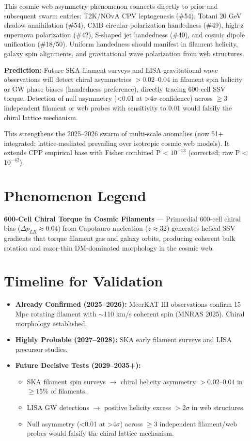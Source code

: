 \documentclass[11pt]{article}
\begin{document}
This cosmic-web asymmetry phenomenon connects directly to prior and subsequent swarm entries: T2K/NOvA CPV leptogenesis (\#54), Totani 20 GeV shadow annihilation (\#54), CMB circular polarization handedness (\#49), high-z supernova polarization (\#42), S-shaped jet handedness (\#40), and cosmic dipole unification (\#18/50). Uniform handedness should manifest in filament helicity, galaxy spin alignments, and gravitational wave polarization from web structures.

\textbf{Prediction:} Future SKA filament surveys and LISA gravitational wave observations will detect chiral asymmetries $> 0.02$--$0.04$ in filament spin helicity or GW phase biases (handedness preference), directly tracing 600-cell SSV torque. Detection of null asymmetry (<0.01 at >4$\sigma$ confidence) across $\geq 3$ independent filament or web probes with sensitivity to 0.01 would falsify the chiral lattice mechanism.

This strengthens the 2025--2026 swarm of multi-scale anomalies (now 51+ integrated; lattice-mediated prevailing over isotropic cosmic web models). It extends CPP empirical base with Fisher combined P < $10^{-13}$ (corrected; raw P < $10^{-42}$).

\section{Phenomenon Legend}
\textbf{600-Cell Chiral Torque in Cosmic Filaments} — Primordial 600-cell chiral bias ($\Delta p_{LR} \approx 0.04$) from Capotauro nucleation ($z \approx 32$) generates helical SSV gradients that torque filament gas and galaxy orbits, producing coherent bulk rotation and razor-thin DM-dominated morphology in the cosmic web.

\section{Timeline for Validation}
\begin{itemize}
    \item \textbf{Already Confirmed (2025--2026):} MeerKAT HI observations confirm 15 Mpc rotating filament with $\sim$110 km/s coherent spin (MNRAS 2025). Chiral morphology established.
    \item \textbf{Highly Probable (2027--2028):} SKA early filament surveys and LISA precursor studies.
    \item \textbf{Future Decisive Tests (2029--2035+):}
    \begin{itemize}
        \item SKA filament spin surveys $\to$ chiral helicity asymmetry $>0.02$--$0.04$ in $\geq 15\%$ of filaments.
        \item LISA GW detections $\to$ positive helicity excess $>2\sigma$ in web structures.
        \item Null asymmetry (<0.01 at >4$\sigma$) across $\geq 3$ independent filament/web probes would falsify the chiral lattice mechanism.
    \end{itemize}
\end{itemize}
\end{document}
